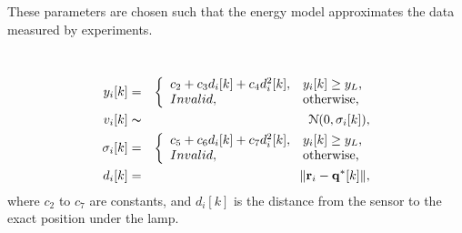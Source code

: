 These parameters are chosen such that the energy model approximates the data measured by experiments.

\begin{mdef}~\label{d:poly}
\begin{eqnarray*}
   y_i[k] &=& \left\{
  \begin{array}{ll}
    c_2 + c_3 d_i[k] + c_4 d_i^2[k], & \hbox{$y_i[k]\geq y_L$,} \\
    Invalid, & \hbox{otherwise,}
  \end{array}
\right.\\
  v_{i}[k] & \thicksim & \mathcal{N}(0,\sigma_i[k]),\\ %
  \sigma_i[k] &=& \left\{
                    \begin{array}{ll}
                      c_5+c_6 d_i[k] + c_7 d_i^2[k], & \hbox{$y_i[k]\geq y_L$,} \\
                      Invalid, & \hbox{otherwise,}
                    \end{array}
                  \right. \\
  d_i[k] &=& \| \mathbf{r}_i-\mathbf{q^\ast}[k] \| ,
\end{eqnarray*}
where $c_2$ to $c_7$ are constants, and $d_i[k]$ is the distance from the sensor to the exact position under the lamp.
\end{mdef}
